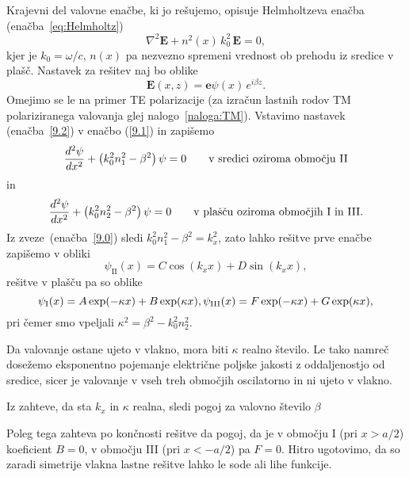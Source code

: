 Krajevni del valovne enačbe, ki jo rešujemo, opisuje Helmholtzeva 
enačba (enačba~\ref{eq:Helmholtz})
\begin{equation}
\nabla^{2}\mathbf{E}+n^2(x)\,k_{0}^{2}\,\mathbf{E}=0,
\label{9.1}
\end{equation}
kjer je $k_{0}=\omega/c$, $n(x)$ pa nezvezno spremeni vrednost ob prehodu iz sredice v plašč. 
Nastavek za rešitev naj bo oblike 
\begin{equation}
{\mathbf E}(x,z)=\mathbf{e}\psi\left(x\right)\, e^{i\beta z}.
\label{9.2}
\end{equation}
Omejimo se le na primer TE polarizacije (za izračun lastnih rodov 
TM polariziranega
valovanja glej nalogo~\ref{naloga:TM}). Vstavimo nastavek (enačba~\ref{9.2}) v enačbo
(\ref{9.1}) in zapišemo
\begin{equation}
\frac{d^{2}{\bf \psi}}{dx^{2}}+\left(k_{0}^{2}n_1^{2}-\beta^{2}\right){\bf \psi}=0
\qquad \textrm{v sredici oziroma obmo\v cju II} 
\label{9.3a}
\end{equation}
in 
\begin{equation}
\frac{d^{2}{\bf \psi}}{dx^{2}}+\left(k_{0}^{2}n_2^{2}-\beta^{2}\right){\bf \psi}=0
\qquad \textrm{v plašču oziroma obmo\v cjih I in III.} 
\label{9.3b}
\end{equation}
Iz zveze~(enačba~\ref{9.0}) sledi $k_0^2n_1^2-\beta^2=k_x^2$, zato lahko rešitve prve enačbe
zapišemo v obliki
\begin{equation}
\psi_{\mathrm{II}}(x) = C \cos(k_x x)+D \sin(k_x x),
\end{equation}
rešitve v plašču pa so oblike
\begin{equation}
\psi_{\mathrm{I}}(x) = A \exp(-\kappa x)+B \exp(\kappa x),\\
\psi_{\mathrm{III}}(x) = F \exp(-\kappa x)+G \exp(\kappa x),
\end{equation}
pri čemer smo vpeljali $\kappa^2= \beta^2-k_0^2n_2^2$.

Da valovanje ostane ujeto v vlakno, mora biti $\kappa$ realno število.
Le tako namreč dosežemo eksponentno pojemanje električne poljske jakosti 
z oddaljenostjo od sredice,
sicer je valovanje v vseh treh območjih oscilatorno in ni ujeto v vlakno. 

Iz zahteve, da sta $k_x$ in $\kappa$ realna, sledi pogoj za valovno 
število $\beta$

Poleg tega zahteva po končnosti rešitve da pogoj, da je v območju I 
(pri $x>a/2$) koeficient $B=0$, 
v območju III (pri $x<-a/2$) pa $F=0$. Hitro ugotovimo, da so zaradi 
simetrije vlakna lastne rešitve lahko le sode ali lihe funkcije. 

